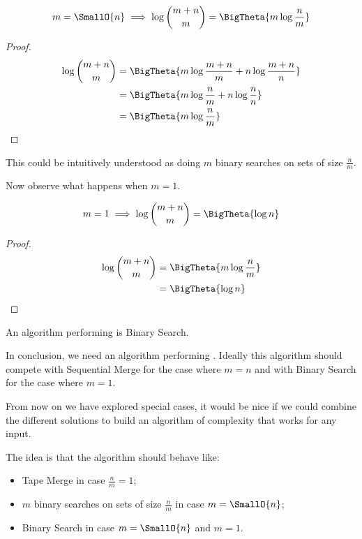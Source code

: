\begin{lemma}
\begin{align*}
m = \SmallO{n} &\implies \log\binom{m+n}{m} = \BigTheta{m \log\frac{n}{m}}\\
\end{align*}
\end{lemma}

\begin{proof}
\begin{align*}
\log\binom{m+n}{m} &= \BigTheta{m \log\frac{m+n}{m} + n \log\frac{m+n}{n}}\\
&= \BigTheta{m \log\frac{n}{m} + n \log\frac{n}{n}}\\
&= \BigTheta{m \log\frac{n}{m}}\\
\end{align*}
\end{proof}


This could be intuitively understood as doing $m$ binary searches on sets of
size $\frac{n}{m}$.


Now observe what happens when $m = 1$.

\begin{lemma}
\begin{align*}
m = 1 &\implies \log\binom{m+n}{m} = \BigTheta{\log n}\\
\end{align*}
\end{lemma}

\begin{proof}
\begin{align*}
\log\binom{m+n}{m} &= \BigTheta{m \log\frac{n}{m}}\\
&= \BigTheta{\log n}\\
\end{align*}
\end{proof}

An algorithm performing  is Binary Search.


In conclusion, we need an algorithm performing .
Ideally this algorithm should compete with Sequential Merge for the case where
$m = n$ and with Binary Search for the case where $m = 1$.


From now on we have explored special cases, it would be nice if we could
combine the different solutions to build an algorithm of complexity  that works for any input.

The idea is that the algorithm should behave like:

\begin{itemize}
\item Tape Merge in case $\frac{n}{m} = 1$;
\item $m$ binary searches on sets of size $\frac{n}{m}$ in case $m = \SmallO{n}$;
\item Binary Search in case \(m = \SmallO{n}\) and \(m = 1\).
\end{itemize}

